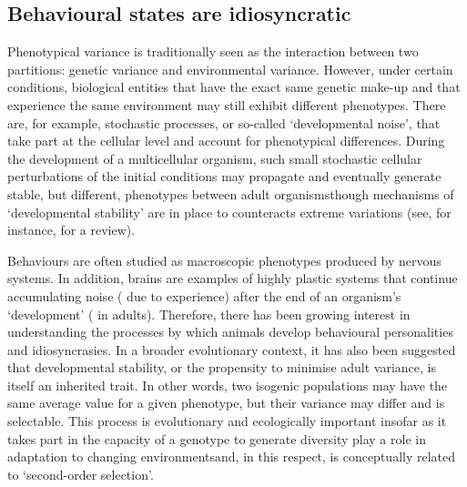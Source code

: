 \subsection{Behavioural states are idiosyncratic}

Phenotypical variance is traditionally seen as the interaction between two partitions: genetic variance and environmental variance.
However, under certain conditions, biological entities that have the exact same genetic make-up and that experience the same environment may still exhibit different phenotypes.
There are, for example, stochastic processes, or so-called `developmental noise', that take part at the cellular level and account for phenotypical differences\cite{yampolsky_developmental_1994}.
During the development of a multicellular organism, such small stochastic cellular perturbations of the initial conditions may propagate and eventually generate stable, but different, phenotypes between adult organisms\emd{}though mechanisms of `developmental stability' are in place to counteracts extreme variations (see, for instance, \cite{debat_mapping_2001} for a review).

Behaviours are often studied as macroscopic phenotypes produced by nervous systems.
In addition, brains are examples of highly plastic systems that continue accumulating noise (\eg{} due to experience) after the end of an organism's `development' (\ie{} in adults).
Therefore, there has been growing interest in understanding the processes by which animals develop behavioural personalities and idiosyncrasies\cite{kain_phototactic_2012}.
In a broader evolutionary context, it has also been suggested that developmental stability, or the propensity to minimise adult variance, is itself an inherited trait.
In other words, two isogenic populations may have the same average value for a given phenotype, but their variance may differ and is selectable\cite{ayroles_behavioral_2015}.
This process is evolutionary and ecologically important insofar as it takes part in
the capacity of a genotype to generate diversity play a role in adaptation to changing environments\cite{gavrilets_quantitative-genetic_1994}\emd{}and, in this respect, is conceptually related to `second-order selection'\cite{tenaillon_second-order_2001}.


